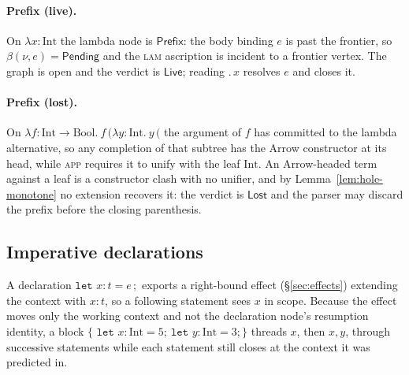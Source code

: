 \paragraph{Prefix (live).}
On $\lambda x{:}\mathrm{Int}$ the lambda node is $\mathsf{Prefix}$: the body
binding $e$ is past the frontier, so $\beta(\nu, e) = \mathsf{Pending}$ and the
\textsc{lam} ascription is incident to a frontier vertex. The graph is open and
the verdict is $\mathsf{Live}$; reading $.\,x$ resolves $e$ and closes it.

\paragraph{Prefix (lost).}
On $\lambda f{:}\mathrm{Int}\to\mathrm{Bool}.\ f\,(\lambda y{:}\mathrm{Int}.\ y\,($
the argument of $f$ has committed to the lambda alternative, so any completion of
that subtree has the Arrow constructor at its head, while \textsc{app} requires it
to unify with the leaf $\mathrm{Int}$. An Arrow-headed term against a leaf is a
constructor clash with no unifier, and by Lemma~\ref{lem:hole-monotone} no
extension recovers it: the verdict is $\mathsf{Lost}$ and the parser may discard
the prefix before the closing parenthesis.

\subsection{Imperative declarations}

A declaration $\texttt{let } x : t = e\,;$ exports a right-bound effect
(\S\ref{sec:effects}) extending the context with $x{:}t$, so a following
statement sees $x$ in scope. Because the effect moves only the working context
and not the declaration node's resumption identity, a block
$\{\texttt{ let } x{:}\mathrm{Int}{=}5;\ \texttt{let } y{:}\mathrm{Int}{=}3; \}$
threads $x$, then $x,y$, through successive statements while each statement still
closes at the context it was predicted in.
